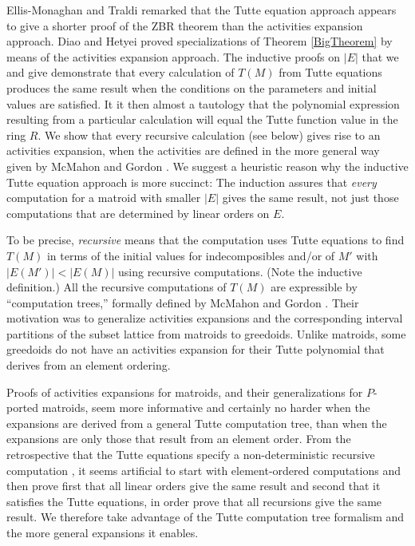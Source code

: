 \documentclass[12pt,leqno]{amsart}
\theoremstyle{remark}
\begin{document}
Ellis-Monaghan and 
Traldi \cite{Ellis-Monaghan-Traldi} remarked that the Tutte equation
approach appears to give a shorter proof of the ZBR theorem
than the activities expansion approach. Diao and Hetyei \cite{RelTuttePoly} 
proved specializations
of Theorem \ref{BigTheorem} by means of the activities expansion approach.
The inductive proofs on $|E|$ that we and \cite{Ellis-Monaghan-Traldi}
give demonstrate that every calculation of $T(M)$ from Tutte equations
produces the same result when the conditions on the parameters
and initial values are satisfied.  It it then almost a 
tautology that the polynomial expression
resulting from
a particular calculation will equal the Tutte function value in the
ring $R$.
We show that every recursive calculation (see below)
gives rise to an 
activities expansion, when the activities are defined in the
more general way given by McMahon and Gordon \cite{GordonMcMachonGreedoid}.
We suggest a heuristic reason why
the inductive Tutte equation approach is more succinct:
The induction assures that
\emph{every} computation for a matroid
with smaller $|E|$ gives the same result, not just those 
computations that are determined by linear orders on $E$.

To be precise, \emph{recursive}
means that the computation uses Tutte equations
to find $T(M)$ in terms of the initial values for
indecomposibles and/or of $M'$ with $|E(M')|<|E(M)|$
using recursive computations.  (Note the inductive
definition.)
All the recursive computations of $T(M)$ 
are expressible by ``computation trees,''
formally defined by McMahon and Gordon 
\cite{GordonMcMachonGreedoid}.
Their motivation was to generalize activities expansions and
the corresponding interval partitions of the subset lattice from
matroids to greedoids.  Unlike matroids, some greedoids
do not have an activities expansion for their Tutte polynomial
that derives from an element ordering.

Proofs of activities expansions for matroids, and their generalizations
for $P$-ported matroids, seem more informative and certainly
no harder when the expansions are derived from a general Tutte
computation tree, than when the expansions are only those
that result from an element order.   
From the retrospective that the Tutte equations
specify a non-deterministic recursive computation
\cite{Garey-Johnson}, it seems artificial to start with
element-ordered computations and then prove
first that all linear orders give the same result and 
second that it 
satisfies the Tutte equations, in order prove that 
all recursions give the same result.
We therefore
take advantage of the Tutte computation tree formalism
and the more general expansions it enables.
\end{document}
